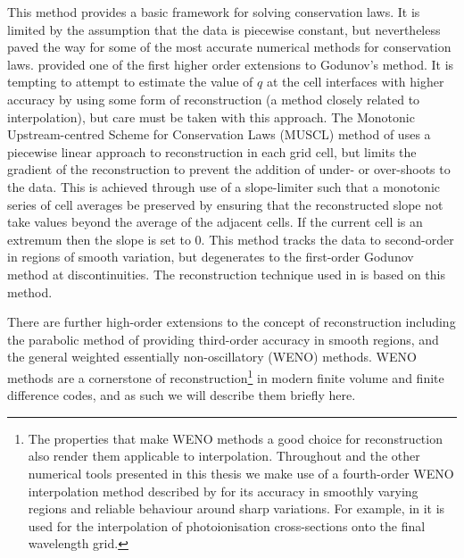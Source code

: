 This method provides a basic framework for solving conservation laws.
It is limited by the assumption that the data is piecewise constant, but nevertheless paved the way for some of the most accurate numerical methods for conservation laws.
\citet{VanLeer1979} provided one of the first higher order extensions to Godunov's method.
It is tempting to attempt to estimate the value of $q$ at the cell interfaces with higher accuracy by using some form of reconstruction (a method closely related to interpolation), but care must be taken with this approach.
The Monotonic Upstream-centred  Scheme for Conservation Laws (MUSCL) method of \citet{VanLeer1979} uses a piecewise linear approach to reconstruction in each grid cell, but limits the gradient of the reconstruction to prevent the addition of under- or over-shoots to the data.
This is achieved through use of a slope-limiter such that a monotonic series of cell averages be preserved by ensuring that the reconstructed slope not take values beyond the average of the adjacent cells.
If the current cell is an extremum then the slope is set to 0.
This method tracks the data to second-order in regions of smooth variation, but degenerates to the first-order Godunov method at discontinuities.
The reconstruction technique used in \Radyn{} is based on this method.

There are further high-order extensions to the concept of reconstruction including the parabolic method of \citet{Colella1984} providing third-order accuracy in smooth regions, and the general weighted essentially non-oscillatory (WENO) methods.
WENO methods are a cornerstone of reconstruction\footnote{The properties that make WENO methods a good choice for reconstruction also render them applicable to interpolation. Throughout \Lw{} and the other numerical tools presented in this thesis we make use of a fourth-order WENO interpolation method described by \citet{Janett2019} for its accuracy in smoothly varying regions and reliable behaviour around sharp variations. For example, in \Lw{} it is used for the interpolation of photoionisation cross-sections onto the final wavelength grid.} in modern finite volume and finite difference codes, and as such we will describe them briefly here.

